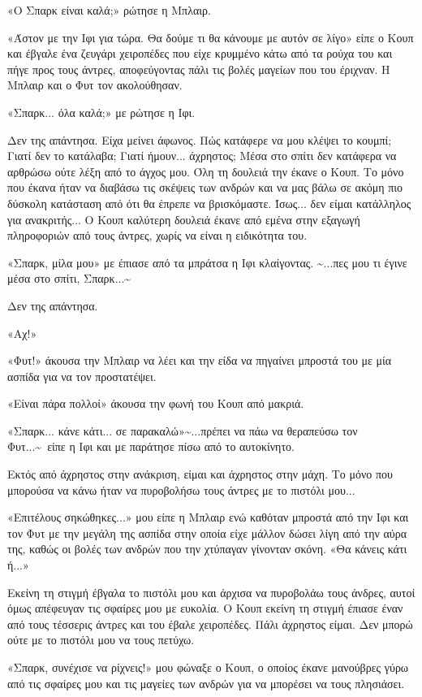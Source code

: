 \documentclass[12pt,twoside, openany]{book}
\begin{document}
«Ο Σπαρκ είναι καλά;» ρώτησε η Μπλαιρ.

«Άστον με την Ιφι για τώρα. Θα δούμε τι θα κάνουμε με αυτόν σε λίγο» είπε ο Κουπ και έβγαλε ένα ζευγάρι χειροπέδες που είχε κρυμμένο κάτω από τα ρούχα του και πήγε προς τους άντρες, αποφεύγοντας πάλι τις βολές μαγείων που του έριχναν. Η Μπλαιρ και ο Φυτ τον ακολούθησαν.

«Σπαρκ... όλα καλά;» με ρώτησε η Ιφι.

Δεν της απάντησα. Είχα μείνει άφωνος. Πώς κατάφερε να μου κλέψει το κουμπί; Γιατί δεν το κατάλαβα; Γιατί ήμουν... άχρηστος; Μέσα στο σπίτι δεν κατάφερα να αρθρώσω ούτε λέξη από το άγχος μου. Όλη τη δουλειά την έκανε ο Κουπ. Το μόνο που έκανα ήταν να διαβάσω τις σκέψεις των ανδρών και να μας βάλω σε ακόμη πιο δύσκολη κατάσταση από ότι θα έπρεπε να βρισκόμαστε. Ίσως... δεν είμαι κατάλληλος για ανακριτής... Ο Κουπ καλύτερη δουλειά έκανε από εμένα στην εξαγωγή πληροφοριών από τους άντρες, χωρίς να είναι η ειδικότητα του.

«Σπαρκ, μίλα μου» με έπιασε από τα μπράτσα η Ιφι κλαίγοντας. \textasciitilde ...πες μου τι έγινε μέσα στο σπίτι, Σπαρκ...\textasciitilde 

Δεν της απάντησα.

«Αχ!»

«Φυτ!» άκουσα την Μπλαιρ να λέει και την είδα να πηγαίνει μπροστά του με μία ασπίδα για να τον προστατέψει.

«Είναι πάρα πολλοί» άκουσα την φωνή του Κουπ από μακριά.

«Σπαρκ... κάνε κάτι... σε παρακαλώ»\textasciitilde ...πρέπει να πάω να θεραπεύσω τον Φυτ...\textasciitilde \  είπε η Ιφι και με παράτησε πίσω από το αυτοκίνητο.

Εκτός από άχρηστος στην ανάκριση, είμαι και άχρηστος στην μάχη. Το μόνο που μπορούσα να κάνω ήταν να πυροβολήσω τους άντρες με το πιστόλι μου...

«Επιτέλους σηκώθηκες...» μου είπε η Μπλαιρ ενώ καθόταν μπροστά από την Ιφι και τον Φυτ με την μεγάλη της ασπίδα στην οποία είχε μάλλον δώσει λίγη από την αύρα της, καθώς οι βολές των ανδρών που την χτύπαγαν γίνονταν σκόνη. «Θα κάνεις κάτι ή...»

Εκείνη τη στιγμή έβγαλα το πιστόλι μου και άρχισα να πυροβολάω τους άνδρες, αυτοί όμως απέφευγαν τις σφαίρες μου με ευκολία. Ο Κουπ εκείνη τη στιγμή έπιασε έναν από τους τέσσερις άντρες και του έβαλε χειροπέδες. Πάλι άχρηστος είμαι. Δεν μπορώ ούτε με το πιστόλι μου να τους πετύχω.

«Σπαρκ, συνέχισε να ρίχνεις!» μου φώναξε ο Κουπ, ο οποίος έκανε μανούβρες γύρω από τις σφαίρες μου και τις μαγείες των ανδρών για να μπορέσει να τους πλησιάσει.
\end{document}
